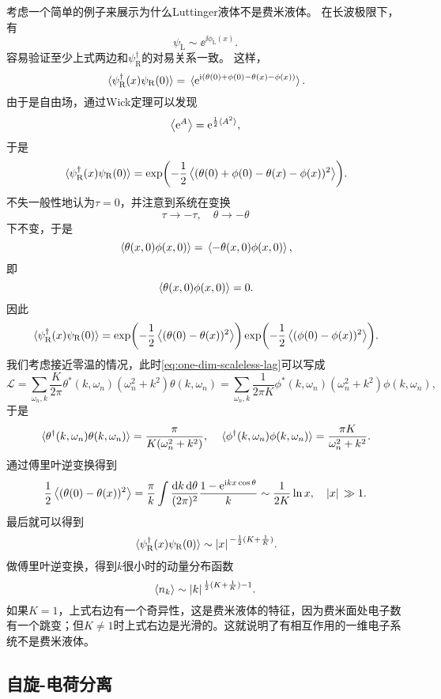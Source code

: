 考虑一个简单的例子来展示为什么Luttinger液体不是费米液体。
在长波极限下，有
\begin{equation}
    {\psi}_\text{L} \sim \ee^{\ii \phi_\text{L}(x)}.
\end{equation}
容易验证至少上式两边和${\psi}^\dagger_\text{R}$的对易关系一致。
这样，
\[
    \expval*{{\psi}_\text{R}^\dagger(x) {\psi}_\text{R}(0)} = \expval*{\mathrm{e}^{\mathrm{i} ({\theta}(0) + {\phi}(0) - {\theta}(x) - {\phi}(x))}}.
\]
由于是自由场，通过Wick定理可以发现
\[
    \expval{\mathrm{e}^{{A}}} = \mathrm{e}^{\frac{1}{2} \expval*{{A}^2}},
\]
于是
\[
    \expval*{{\psi}_\text{R}^\dagger(x) {\psi}_\text{R}(0)} = \exp(- \frac{1}{2} \expval{({\theta}(0) + {\phi}(0) - {\theta}(x) - {\phi}(x))^2}).
\]
不失一般性地认为$\tau=0$，并注意到系统在变换
\[
    \tau \longrightarrow - \tau, \quad \theta \longrightarrow -\theta
\]
下不变，于是
\[
    \expval*{{\theta}(x, 0) {\phi}(x, 0)} = \expval*{- {\theta}(x, 0) {\phi}(x, 0)},
\]
即
\[
    \expval*{{\theta}(x, 0) {\phi}(x, 0)} = 0.
\]
因此
\[
    \expval*{{\psi}_\text{R}^\dagger(x) {\psi}_\text{R}(0)} = \exp(- \frac{1}{2} \expval{({\theta}(0) - {\theta}(x))^2}) \exp(- \frac{1}{2} \expval{({\phi}(0) - {\phi}(x))^2}).
\]
我们考虑接近零温的情况，此时\eqref{eq:one-dim-scaleless-lag}可以写成
\[
    \mathcal{L} = \sum_{\omega_n, k} \frac{K}{2\pi} \theta^*(k, \omega_n) (\omega_n^2 + k^2) \theta(k, \omega_n) = \sum_{\omega_n, k} \frac{1}{2\pi K} \phi^*(k, \omega_n) (\omega_n^2 + k^2) \phi(k, \omega_n),
\]
于是
\[
    \expval*{{\theta}^\dagger(k, \omega_n) {\theta}(k, \omega_n)} = \frac{\pi}{K (\omega_n^2 + k^2)}, \quad \expval*{{\phi}^\dagger(k, \omega_n) {\phi}(k, \omega_n)} = \frac{\pi K}{\omega_n^2 + k^2}.
\]
通过傅里叶逆变换得到
\[
    \frac{1}{2} \expval{({\theta}(0) - {\theta}(x))^2} = \frac{\pi}{k} \int \frac{\dd{k} \dd{\theta}}{(2\pi)^2} \frac{1 - \mathrm{e}^{\mathrm{i} k x \cos \theta}}{k} \sim \frac{1}{2K} \ln x, \quad \abs*{x} \gg 1.
\]
最后就可以得到
\[
    \expval*{{\psi}_\text{R}^\dagger(x) {\psi}_\text{R}(0)} \sim \abs*{x}^{-\frac{1}{2}(K + \frac{1}{K})}.
\]
做傅里叶逆变换，得到$k$很小时的动量分布函数
\[
    \expval{{n}_k} \sim \abs*{k}^{\frac{1}{2}(K + \frac{1}{K}) - 1}.
\]
如果$K=1$，上式右边有一个奇异性，这是费米液体的特征，因为费米面处电子数有一个跳变；但$K \neq 1$时上式右边是光滑的。这就说明了有相互作用的一维电子系统不是费米液体。

\subsection{自旋-电荷分离}

